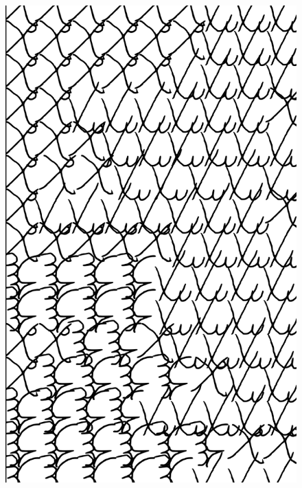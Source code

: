 \makeatletter\@openrightfalse
\movetooddpage
\begin{absolutelynopagebreak}
\begin{vplace}
\begin{figure}[H]
\begin{adjustwidth}{-0.99cm}{}
  \centering
  \vspace*{-1.97cm}
  \hspace*{-0.65cm}
  \includegraphics[width=115mm]{./imgs/img8.pdf}  
  \hfill
\end{adjustwidth}

\thispagestyle{empty}

\end{figure}
\end{vplace}

\end{absolutelynopagebreak}

